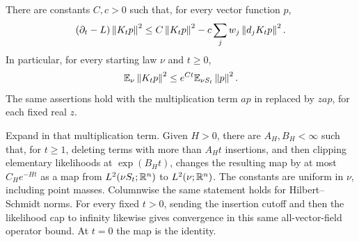 \begin{proposition}
\label{prop:path-rough}
There are constants $C,c>0$ such that, for every vector function $p$,
\begin{equation}
 (\partial_t-L)\left\lVert K_tp\right\rVert^2
 \le C\left\lVert K_tp\right\rVert^2-c\sum_jw_j\left\lVert d_jK_tp\right\rVert^2.
 \label{eq:path-square}
\end{equation}
In particular, for every starting law $\nu$ and $t\ge0$,
\begin{equation}
 \mathbb E_\nu\left\lVert K_tp\right\rVert^2\le e^{Ct}\mathbb E_{\nu S_t}\left\lVert p\right\rVert^2.
 \label{eq:path-rough-L2}
\end{equation}
The same assertions hold with the multiplication term $ap$ in
 replaced by $z ap$, for each fixed real $z$.

Expand in that multiplication term.  Given $H>0$, there are
$A_H,B_H<\infty$ such that, for $t\ge1$, deleting terms with more than
$A_Ht$ insertions, and then clipping elementary likelihoods at
$\exp(B_Ht)$, changes the resulting map by at most $C_He^{-Ht}$
as a map from $L^2(\nu S_t;\mathbb R^n)$ to $L^2(\nu;\mathbb R^n)$.
The constants are uniform in $\nu$, including point masses.
Columnwise the same statement holds for Hilbert--Schmidt norms.
For every fixed $t>0$, sending the insertion cutoff and then the
likelihood cap to infinity likewise gives convergence in this same
all-vector-field operator bound.  At $t=0$ the map is the identity.
\end{proposition}

